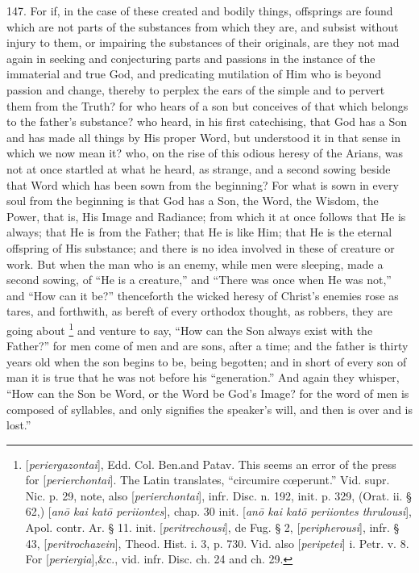 147. For if, in the case of
these created and bodily things, offsprings are found which are not
parts of the substances from which they are, and subsist without
injury to them, or impairing the substances of their originals, are
they not mad again in seeking and conjecturing parts and passions in
the instance of the immaterial and true God, and predicating
mutilation of Him who is beyond passion and change, thereby to perplex
the ears of the simple and to pervert them from the Truth? for who
hears of a son but conceives of that which belongs to the father's
substance? who heard, in his first catechising, that God has a Son and
has made all things by His proper Word, but understood it in that
sense in which we now mean it? who, on the rise of this odious heresy
of the Arians, was not at once startled at what he heard, as strange,
and a second sowing beside that Word which has been sown from
the beginning? For what is sown in every soul from the beginning is
that God has a Son, the Word, the Wisdom, the Power, that is, His
Image and Radiance; from which it at once follows that He is always;
that He is from the Father; that He is like Him; that He is the
eternal offspring of His substance; and there is no idea involved in
these of creature or work. But when the man who is an enemy, while men
were sleeping, made a second sowing, of ``He is a creature,'' and ``There
was once when He was not,'' and ``How can it be?'' thenceforth the wicked
heresy of Christ's enemies rose as tares, and forthwith, as bereft of
every orthodox thought, as robbers, they are going about \footnote{[\emph{periergazontai}], Edd. Col. Ben.\emph{}and Patav. This seems
an error of the press for [\emph{perierchontai}]. The Latin
translates, ``circumire cœperunt.'' Vid. supr. Nic. p. 29, note, also [\emph{perierchontai}],
infr. Disc. n. 192, init. p. 329, (Orat. ii. § 62,) [\emph{an\={o}
kai kat\={o} periiontes}], chap. 30 init. [\emph{an\={o} kai kat\={o}
periiontes thrulousi}], Apol. contr. Ar. § 11. init. [\emph{peritrechousi}],
de Fug. § 2, [\emph{peripherousi}], infr. § 43, [\emph{peritrochazein}],
Theod. Hist. i. 3, p. 730. Vid. also [\emph{peripetei}] i. Petr. v. 8. For [\emph{periergia}],\emph{}\&c., vid. infr. Disc. ch. 24 and ch. 29.} and venture to say, ``How can the Son always exist with the
Father?'' for men come of men and are sons, after a time; and the
father is thirty years old when the son begins to be, being begotten;
and in short of every son of man it is true that he was not before his
``generation.'' And again they whisper, ``How can the Son be Word, or the
Word be God's Image? for the word of men is composed of syllables, and
only signifies the speaker's will, and then is over and is lost.''

